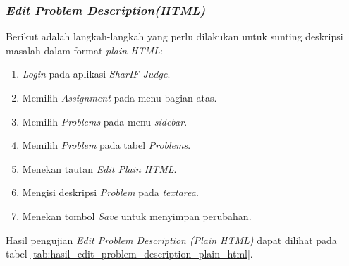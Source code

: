 \subsubsection{\textit{Edit Problem Description(HTML)}}
\label{subsubsec:skenario_edit_problem_description_plain_html}
Berikut adalah langkah-langkah yang perlu dilakukan untuk sunting deskripsi masalah dalam format \textit{plain HTML}:

\begin{enumerate}
	\item \textit{Login} pada aplikasi \textit{SharIF Judge}.
	\item Memilih \textit{Assignment} pada menu bagian atas.
	\item Memilih \textit{Problems} pada menu \textit{sidebar}.
	\item Memilih \textit{Problem} pada tabel \textit{Problems}.
	\item Menekan tautan \textit{Edit Plain HTML}.
	\item Mengisi deskripsi \textit{Problem} pada \textit{textarea}.
	\item Menekan tombol \textit{Save} untuk menyimpan perubahan.
\end{enumerate}

Hasil pengujian \textit{Edit Problem Description (Plain HTML)} dapat dilihat pada tabel \ref{tab:hasil_edit_problem_description_plain_html}.

